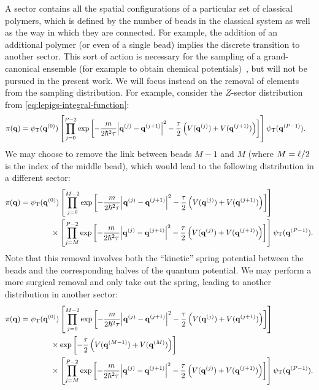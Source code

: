 A sector contains all the spatial configurations of a particular set of classical polymers, which is defined by the number of beads in the classical system as well as the way in which they are connected.
For example, the addition of an additional polymer (or even of a single bead) implies the discrete transition to another sector.
This sort of action is necessary for the sampling of a grand-canonical ensemble (for example to obtain chemical potentials)~\cite{herdman2014quantum}, but will not be pursued in the present work.
We will focus instead on the removal of elements from the sampling distribution.
For example, consider the $Z$-sector distribution from \cref{eq:lepigs-integral-function}:
\begin{align}
	\pi(\bm{\mathbf{q}})
	&= \psi_\mathrm{T}(\bm{\mathbf{q}}^{(0)})
		\left[ \prod_{j=0}^{P-2} \exp{\left[ 
			-\frac{m}{2 \hbar^2 \tau} \abs{\bm{\mathbf{q}}^{(j)} - \bm{\mathbf{q}}^{(j+1)}}^2
			- \frac{\tau}{2} \left( V(\bm{\mathbf{q}}^{(j)}) + V(\bm{\mathbf{q}}^{(j+1)}) \right)
		 \right]} \right]
		\psi_\mathrm{T}(\bm{\mathbf{q}}^{(P-1)}).
			\label{eq:ugly-distribution1}
\end{align}
We may choose to remove the link between beads $M-1$ and $M$ (where $M = \ell / 2$ is the index of the middle bead), which would lead to the following distribution in a different sector:
\begin{align}
	\pi(\bm{\mathbf{q}})
	&= \psi_\mathrm{T}(\bm{\mathbf{q}}^{(0)})
		\left[ \prod_{j=0}^{M-2} \exp{\left[ 
			-\frac{m}{2 \hbar^2 \tau} \abs{\bm{\mathbf{q}}^{(j)} - \bm{\mathbf{q}}^{(j+1)}}^2
			- \frac{\tau}{2} \left( V(\bm{\mathbf{q}}^{(j)}) + V(\bm{\mathbf{q}}^{(j+1)}) \right)
		 \right]} \right] \notag \\
	&\qquad\qquad\times
		\left[ \prod_{j=M}^{P-2} \exp{\left[ 
			-\frac{m}{2 \hbar^2 \tau} \abs{\bm{\mathbf{q}}^{(j)} - \bm{\mathbf{q}}^{(j+1)}}^2
			- \frac{\tau}{2} \left( V(\bm{\mathbf{q}}^{(j)}) + V(\bm{\mathbf{q}}^{(j+1)}) \right)
		 \right]} \right]
		\psi_\mathrm{T}(\bm{\mathbf{q}}^{(P-1)}).
			\label{eq:ugly-distribution2}
\end{align}
Note that this removal involves both the ``kinetic'' spring potential between the beads and the corresponding halves of the quantum potential.
We may perform a more surgical removal and only take out the spring, leading to another distribution in another sector:
\begin{align}
	\pi(\bm{\mathbf{q}})
	&= \psi_\mathrm{T}(\bm{\mathbf{q}}^{(0)})
		\left[ \prod_{j=0}^{M-2} \exp{\left[ 
			-\frac{m}{2 \hbar^2 \tau} \abs{\bm{\mathbf{q}}^{(j)} - \bm{\mathbf{q}}^{(j+1)}}^2
			- \frac{\tau}{2} \left( V(\bm{\mathbf{q}}^{(j)}) + V(\bm{\mathbf{q}}^{(j+1)}) \right)
		 \right]} \right] \notag \\
	&\qquad\qquad\times
		\exp{\left[ -\frac{\tau}{2} \left( V(\bm{\mathbf{q}}^{(M-1)}) + V(\bm{\mathbf{q}}^{(M)}) \right) \right]} \notag \\
	&\qquad\qquad\times
		\left[ \prod_{j=M}^{P-2} \exp{\left[ 
			-\frac{m}{2 \hbar^2 \tau} \abs{\bm{\mathbf{q}}^{(j)} - \bm{\mathbf{q}}^{(j+1)}}^2
			- \frac{\tau}{2} \left( V(\bm{\mathbf{q}}^{(j)}) + V(\bm{\mathbf{q}}^{(j+1)}) \right)
		 \right]} \right]
		\psi_\mathrm{T}(\bm{\mathbf{q}}^{(P-1)}).
			\label{eq:ugly-distribution3}
\end{align}

